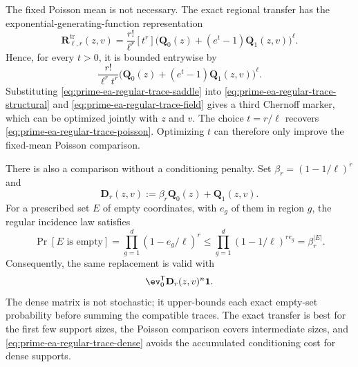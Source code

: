 The fixed Poisson mean is not necessary.  The exact regional transfer has the
exponential-generating-function representation
\begin{equation}
 \mathbf R^{\mathrm{tr}}_{\ell,r}(z,v)
 =\frac{r!}{\ell^r}[t^r]
  \bigl(\mathbf Q_0(z)+(e^t-1)\mathbf Q_1(z,v)\bigr)^\ell.
 \label{eq:prime-ea-regular-trace-egf}
\end{equation}
Hence, for every $t>0$, it is bounded entrywise by
\begin{equation}
 \frac{r!}{\ell^rt^r}
  \bigl(\mathbf Q_0(z)+(e^t-1)\mathbf Q_1(z,v)\bigr)^\ell.
 \label{eq:prime-ea-regular-trace-saddle}
\end{equation}
Substituting \eqref{eq:prime-ea-regular-trace-saddle} into
\eqref{eq:prime-ea-regular-trace-structural} and
\eqref{eq:prime-ea-regular-trace-field} gives a third Chernoff marker, which
can be optimized jointly with $z$ and $v$.  The choice $t=r/\ell$ recovers
\eqref{eq:prime-ea-regular-trace-poisson}.  Optimizing $t$ can therefore only
improve the fixed-mean Poisson comparison.

There is also a comparison without a conditioning penalty.  Set
$\beta_r=(1-1/\ell)^r$ and
\begin{equation}
 \mathbf D_r(z,v):=\beta_r\mathbf Q_0(z)+\mathbf Q_1(z,v).
 \label{eq:prime-ea-regular-trace-dense-matrix}
\end{equation}
For a prescribed set $E$ of empty coordinates, with $e_g$ of them in region
$g$, the regular incidence law satisfies
\[
 \Pr[E\text{ is empty}]
 =\prod_{g=1}^d(1-e_g/\ell)^r
 \leq \prod_{g=1}^d(1-1/\ell)^{re_g}
 =\beta_r^{|E|}.
\]
Consequently, the same replacement is valid with
\begin{equation}
 \ev_0^{\mathsf T}\mathbf D_r(z,v)^n\boldsymbol 1.
 \label{eq:prime-ea-regular-trace-dense}
\end{equation}
The dense matrix is not stochastic; it upper-bounds each exact empty-set
probability before summing the compatible traces.  The exact transfer is best
for the first few support sizes, the Poisson comparison covers intermediate
sizes, and \eqref{eq:prime-ea-regular-trace-dense} avoids the accumulated
conditioning cost for dense supports.

